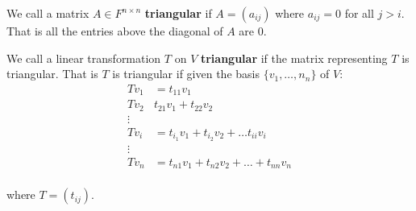 \begin{definition}
    We call a matrix $A \in F^{n \times n}$ \textbf{triangular} if $A=(a_{ij})$
    where $a_{ij}=0$ for all $j > i$. That is all the entries above the
    diagonal of $A$ are  $0$.
\end{definition}

\begin{definition}
    We call a linear transformation $T$ on  $V$  \textbf{triangular} if the
    matrix representing $T$ is triangular. That is  $T$ is triangular if given
    the basis  $\{v_1, \dots, n_n\}$ of $V$:
        \begin{equation}
            \begin{align*}
                Tv_1    &=  t_{11}v_1       \\
                Tv_2    &   t_{21}v_1+t_{22}v_2     \\
                        \vdots                  \\
                Tv_i    &=  t_{i_1}v_1+t_{i_2}v_2+\dots t_{ii}v_i    \\
                        \vdots                  \\
                Tv_n    &=  t_{n1}v_1+t_{n2}v_2+\dots+t_{nn}v_n     \\
            \end{align*}
        \end{equation}

    where $T=(t_{ij})$.
\end{definition}

